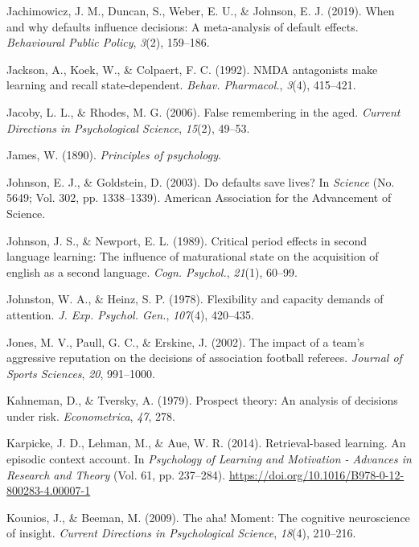 \documentclass[
]{krantz}
\newlength{\cslhangindent}
\newenvironment{CSLReferences}[2] %
 {\begin{list}{}{%
  \setlength{\itemindent}{0pt}
  \setlength{\leftmargin}{0pt}
  \setlength{\parsep}{0pt}
  \ifodd #1
   \setlength{\leftmargin}{\cslhangindent}
   \setlength{\itemindent}{-1\cslhangindent}
  \fi
  \setlength{\itemsep}{#2\baselineskip}}}
 {\end{list}}
\begin{document}
\begin{CSLReferences}{1}{0}
Jachimowicz, J. M., Duncan, S., Weber, E. U., \& Johnson, E. J. (2019). When and why defaults influence decisions: A meta-analysis of default effects. \emph{Behavioural Public Policy}, \emph{3}(2), 159--186.

Jackson, A., Koek, W., \& Colpaert, F. C. (1992). {NMDA} antagonists make learning and recall state-dependent. \emph{Behav. Pharmacol.}, \emph{3}(4), 415--421.

Jacoby, L. L., \& Rhodes, M. G. (2006). False remembering in the aged. \emph{Current Directions in Psychological Science}, \emph{15}(2), 49--53.

James, W. (1890). \emph{Principles of psychology}.

Johnson, E. J., \& Goldstein, D. (2003). Do defaults save lives? In \emph{Science} (No. 5649; Vol. 302, pp. 1338--1339). American Association for the Advancement of Science.

Johnson, J. S., \& Newport, E. L. (1989). Critical period effects in second language learning: The influence of maturational state on the acquisition of english as a second language. \emph{Cogn. Psychol.}, \emph{21}(1), 60--99.

Johnston, W. A., \& Heinz, S. P. (1978). Flexibility and capacity demands of attention. \emph{J. Exp. Psychol. Gen.}, \emph{107}(4), 420--435.

Jones, M. V., Paull, G. C., \& Erskine, J. (2002). The impact of a team's aggressive reputation on the decisions of association football referees. \emph{Journal of Sports Sciences}, \emph{20}, 991--1000.

Kahneman, D., \& Tversky, A. (1979). Prospect theory: An analysis of decisions under risk. \emph{Econometrica}, \emph{47}, 278.

Karpicke, J. D., Lehman, M., \& Aue, W. R. (2014). Retrieval-based learning. An episodic context account. In \emph{Psychology of Learning and Motivation - Advances in Research and Theory} (Vol. 61, pp. 237--284). \url{https://doi.org/10.1016/B978-0-12-800283-4.00007-1}

Kounios, J., \& Beeman, M. (2009). The aha! Moment: The cognitive neuroscience of insight. \emph{Current Directions in Psychological Science}, \emph{18}(4), 210--216.


\end{CSLReferences}
\end{document}

